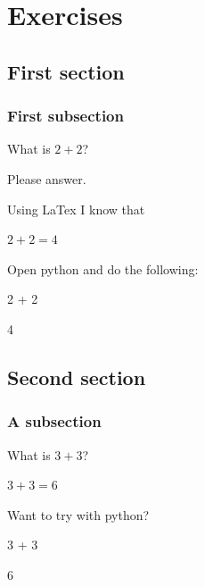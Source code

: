 \documentclass[oneside]{book}
\begin{document}
\chapter{Exercises}

\section{First section}

\subsection{First subsection}

\begin{exercise}[subtitle={Simple Addition}]
  What is \(2 + 2\)?

  Please answer.
\end{exercise}

\begin{solution}
Using LaTex I know that

  \(2 + 2 = 4\)
\end{solution}

\begin{additionalinformation}
Open python and do the following:

\begin{pycell}
2 + 2
\end{pycell}
\begin{pyexpectedoutput}
4
\end{pyexpectedoutput}
\end{additionalinformation}

\section{Second section}

\subsection{A subsection}

\begin{exercise}[examdate={January 14, 2020}, examproblemnumber={1}, examproblemid={2020-01-14-01}]
  What is \(3 + 3\)?
\end{exercise}

\begin{solution}
  \(3 + 3 = 6\)

Want to try with python?
\begin{pycell}
3 + 3
\end{pycell}
\begin{pyexpectedoutput}
6
\end{pyexpectedoutput}
\end{solution}
\end{document}
